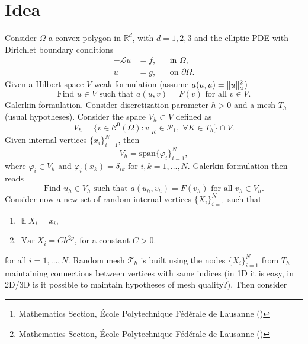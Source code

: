 \documentclass{siamart1116}
\title{{\TheTitle}}
\author{Assyr Abdulle\thanks{Mathematics Section, \'Ecole Polytechnique F\'ed\'erale de Lausanne (\email{assyr.abdulle@epfl.ch})}
	\and
	Giacomo Garegnani\thanks{Mathematics Section, \'Ecole Polytechnique F\'ed\'erale de Lausanne (\email{giacomo.garegnani@epfl.ch})}}
\numberwithin{theorem}{section}
\DeclarePairedDelimiter{\norm}{\|}{\|}
\renewcommand{\phi}{\varphi}
\newcommand{\R}{\mathbb{R}}
\newcommand{\diffL}{\mathcal{L}}
\newcommand{\Var}{\operatorname{Var}}
\newcommand{\E}{\operatorname{\mathbb{E}}}
\begin{document}
	
\maketitle	

\section{Idea} Consider $\Omega$ a convex polygon in $\R^d$, with $d = 1, 2, 3$ and the elliptic PDE with Dirichlet boundary conditions
\begin{equation}
\begin{aligned}
	-\diffL u &= f, && \text{in } \Omega,\\
	u &= g, && \text{on } \partial\Omega.
\end{aligned}
\end{equation}
Given a Hilbert space $V$ weak formulation (assume $a(u, u) = \norm{u}_a^2$)
\begin{equation}
	\text{Find } u \in V \text{ such that } a(u,v) = F(v) \text{ for all } v \in V.
\end{equation}
Galerkin formulation. Consider discretization parameter $h > 0$ and a mesh $T_h$ (usual hypotheses). Consider the space $V_h \subset V$ defined as
\begin{equation}
	V_h = \{v \in \mathcal{C}^0(\Omega) \colon v|_{K} \in \mathcal{P}_1, \; \forall K \in T_h\} \cap V.
\end{equation}
Given internal vertices $\{x_i\}_{i=1}^N$, then
\begin{equation}
	V_h = \mathrm{span}\{\phi_i\}_{i=1}^N,
\end{equation}
where $\phi_i \in V_h$ and $\phi_i(x_k) = \delta_{ik}$ for $i, k = 1, \ldots, N$. Galerkin formulation then reads
\begin{equation}
	\text{Find } u_h \in V_h \text{ such that } a(u_h,v_h) = F(v_h) \text{ for all } v_h \in V_h.
\end{equation}
Consider now a new set of random internal vertices $\{X_i\}_{i=1}^N$ such that
\begin{enumerate}
	\item $\E X_i = x_i$, 
	\item $\Var X_i = Ch^{2p}$, for a constant $C > 0$.
\end{enumerate}
for all $i = 1, \ldots, N$. Random mesh $\mathcal{T}_h$ is built using the nodes $\{X_i\}_{i=1}^N$ from $T_h$ maintaining connections between vertices with same indices (in 1D it is easy, in 2D/3D is it possible to maintain hypotheses of mesh quality?). Then consider
\end{document}

